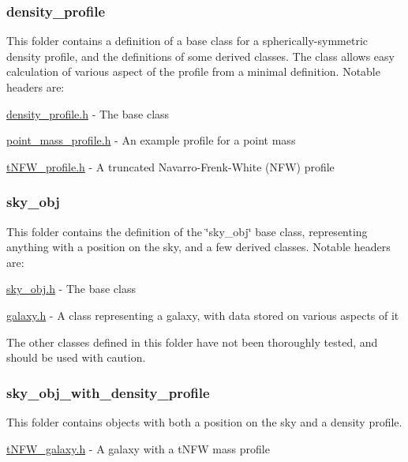 \subsubsection*{density\+\_\+profile}

This folder contains a definition of a base class for a spherically-\/symmetric density profile, and the definitions of some derived classes. The class allows easy calculation of various aspect of the profile from a minimal definition. Notable headers are\+:


\begin{DoxyItemize}
\item \hyperlink{density__profile_8h}{density\+\_\+profile.\+h} -\/ The base class
\item \hyperlink{point__mass__profile_8h}{point\+\_\+mass\+\_\+profile.\+h} -\/ An example profile for a point mass
\item \hyperlink{tNFW__profile_8h}{t\+N\+F\+W\+\_\+profile.\+h} -\/ A truncated Navarro-\/\+Frenk-\/\+White (N\+F\+W) profile
\end{DoxyItemize}

\subsubsection*{sky\+\_\+obj}

This folder contains the definition of the \char`\"{}sky\+\_\+obj\char`\"{} base class, representing anything with a position on the sky, and a few derived classes. Notable headers are\+:


\begin{DoxyItemize}
\item \hyperlink{sky__obj_8h}{sky\+\_\+obj.\+h} -\/ The base class
\item \hyperlink{galaxy_8h}{galaxy.\+h} -\/ A class representing a galaxy, with data stored on various aspects of it
\end{DoxyItemize}

The other classes defined in this folder have not been thoroughly tested, and should be used with caution.

\subsubsection*{sky\+\_\+obj\+\_\+with\+\_\+density\+\_\+profile}

This folder contains objects with both a position on the sky and a density profile.


\begin{DoxyItemize}
\item \hyperlink{tNFW__galaxy_8h}{t\+N\+F\+W\+\_\+galaxy.\+h} -\/ A galaxy with a t\+N\+F\+W mass profile 
\end{DoxyItemize}